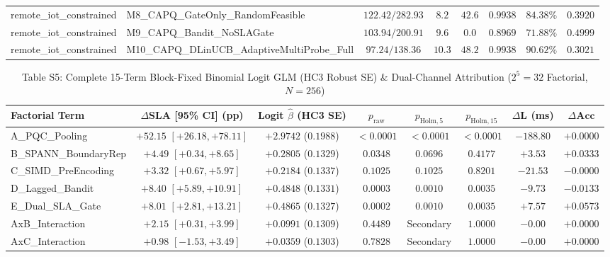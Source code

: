 \documentclass[10pt,journal,compsoc]{IEEEtran}
\begin{document}
\begin{table}[!t]
\begin{adjustbox}{max width=\textwidth}
\begin{tabular}{@{}llcccccc@{}}
remote\_iot\_constrained & M8\_CAPQ\_GateOnly\_RandomFeasible & $122.42 / 282.93$ & $8.2$ & $42.6$ & $0.9938$ & $84.38\%$ & $0.3920$ \\
remote\_iot\_constrained & M9\_CAPQ\_Bandit\_NoSLAGate & $103.94 / 200.91$ & $9.6$ & $0.0$ & $0.8969$ & $71.88\%$ & $0.4999$ \\
remote\_iot\_constrained & M10\_CAPQ\_DLinUCB\_AdaptiveMultiProbe\_Full & $97.24 / 138.36$ & $10.3$ & $48.2$ & $0.9938$ & $90.62\%$ & $0.3021$ \\
\bottomrule
\end{tabular}
\end{adjustbox}
\end{table}

\begin{table}[!t]
\centering
\caption{Table S5: Complete 15-Term Block-Fixed Binomial Logit GLM (HC3 Robust SE) \& Dual-Channel Attribution ($2^5=32$ Factorial, $N=256$)}
\setlength{\tabcolsep}{3.5pt}
\renewcommand{\arraystretch}{1.04}
\begin{adjustbox}{max width=\textwidth}
\begin{tabular}{@{}lccccccc@{}}
\toprule
\textbf{Factorial Term} & $\Delta$\textbf{SLA [95\% CI] (pp)} & \textbf{Logit $\hat{\beta}$ (HC3 SE)} & $p_{\mathrm{raw}}$ & $p_{\mathrm{Holm},5}$ & $p_{\mathrm{Holm},15}$ & $\Delta\mathbf{L}$ \textbf{(ms)} & $\Delta\mathbf{Acc}$ \\
\midrule
A\_PQC\_Pooling & $+52.15$ $[+26.18, +78.11]$ & $+2.9742$ ($0.1988$) & $<0.0001$ & $<0.0001$ & $<0.0001$ & $-188.80$ & $+0.0000$ \\
B\_SPANN\_BoundaryRep & $+4.49$ $[+0.34, +8.65]$ & $+0.2805$ ($0.1329$) & $0.0348$ & $0.0696$ & $0.4177$ & $+3.53$ & $+0.0333$ \\
C\_SIMD\_PreEncoding & $+3.32$ $[+0.67, +5.97]$ & $+0.2184$ ($0.1337$) & $0.1025$ & $0.1025$ & $0.8201$ & $-21.53$ & $-0.0000$ \\
D\_Lagged\_Bandit & $+8.40$ $[+5.89, +10.91]$ & $+0.4848$ ($0.1331$) & $0.0003$ & $0.0010$ & $0.0035$ & $-9.73$ & $-0.0133$ \\
E\_Dual\_SLA\_Gate & $+8.01$ $[+2.81, +13.21]$ & $+0.4865$ ($0.1327$) & $0.0002$ & $0.0010$ & $0.0035$ & $+7.57$ & $+0.0573$ \\
AxB\_Interaction & $+2.15$ $[+0.31, +3.99]$ & $+0.0991$ ($0.1309$) & $0.4489$ & Secondary & $1.0000$ & $-0.00$ & $+0.0000$ \\
AxC\_Interaction & $+0.98$ $[-1.53, +3.49]$ & $+0.0359$ ($0.1303$) & $0.7828$ & Secondary & $1.0000$ & $-0.00$ & $+0.0000$ \\

\end{tabular}
\end{adjustbox}
\end{table}
\end{document}
